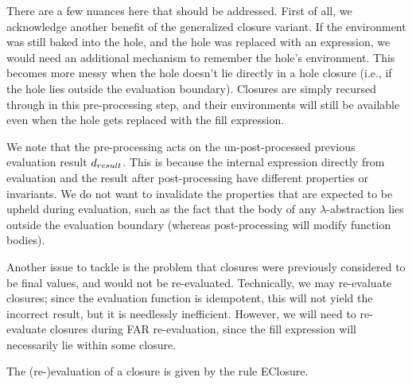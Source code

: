 There are a few nuances here that should be addressed. First of all, we acknowledge another benefit of the generalized closure variant. If the environment was still baked into the hole, and the hole was replaced with an expression, we would need an additional mechanism to remember the hole's environment. This becomes more messy when the hole doesn't lie directly in a hole closure (i.e., if the hole lies outside the evaluation boundary). Closures are simply recursed through in this pre-processing step, and their environments will still be available even when the hole gets replaced with the fill expression.

We note that the pre-processing acts on the un-post-processed previous evaluation result $\dresult$. This is because the internal expression directly from evaluation and the result after post-processing have different properties or invariants. We do not want to invalidate the properties that are expected to be upheld during evaluation, such as the fact that the body of any $\lambda$-abstraction lies outside the evaluation boundary (whereas post-processing will modify function bodies).

Another issue to tackle is the problem that closures were previously considered to be final values, and would not be re-evaluated. Technically, we may re-evaluate closures; since the evaluation function is idempotent, this will not yield the incorrect result, but it is needlessly inefficient. However, we will need to re-evaluate closures during FAR re-evaluation, since the fill expression will necessarily lie within some closure.


The (re-)evaluation of a closure is given by the rule EClosure.

\begin{singlespace}
  \begin{mathpar}
  \end{mathpar}
\end{singlespace}

